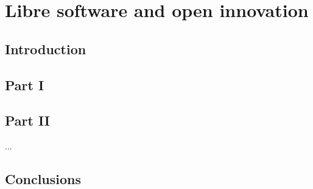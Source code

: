 \chapter{Libre software and open innovation}

\section{Introduction}

\section{Part I}\label{Part I}  %


\section{Part II}\label{Part II} %

...

\section{Conclusions}\label{conclusions}